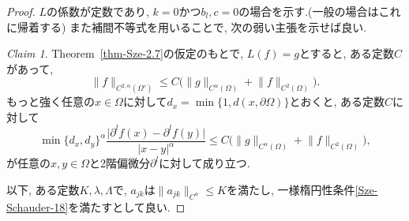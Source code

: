 \documentclass[dvipdfmx,a4paper,11pt]{article} %
\theoremstyle{definition}
\theoremstyle{remark}
\newtheorem{claim}[thm]{Claim}
\numberwithin{equation}{section}
\begin{document}
\begin{proof}
$L$の係数が定数であり, $k=0$かつ$b_l,c=0$の場合を示す.(一般の場合はこれに帰着する)
また補間不等式を用いることで, 次の弱い主張を示せば良い.
\begin{claim}
\label{claim-weak-schauder}
Theorem~\ref{thm-Sze-2.7}の仮定のもとで, $L(f)=g$とすると, ある定数$C$があって, 
\[
\lVert f\rVert_{C^{2,\alpha}(\Omega')}\leq C\bigl(\lVert g\rVert_{C^\alpha(\Omega)}+\lVert f\rVert_{C^2(\Omega)}\bigr).
\]
もっと強く任意の$x\in\Omega$に対して$d_x=\min\{1,d(x,\partial\Omega)\}$とおくと, ある定数$C$に対して
\[
\min\{d_x,d_y\}^\alpha\frac{\lvert\partial^l f(x)-\partial^l f(y)\rvert}{\lvert x-y\rvert^\alpha}
\leq C\bigl(\lVert g\rVert_{C^\alpha(\Omega)}+\lVert f\rVert_{C^2(\Omega)}\bigr),
\]
が任意の$x,y\in\Omega$と2階偏微分$\partial^l$に対して成り立つ. 
\end{claim}
 
以下, ある定数$K,\lambda,\Lambda$で,  $a_{jk}$は$\lVert a_{jk}\rVert_{C^\alpha}\leq K$を満たし, 一様楕円性条件\eqref{Sze-Schauder-18}を満たすとして良い. 


\end{proof}
\end{document}
